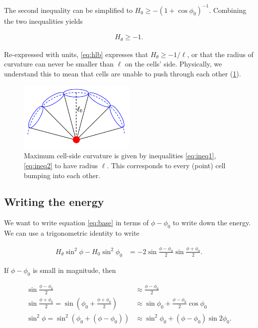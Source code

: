 \noindent The second inequality can be simplified to $H_0 \geq -(1+\cos\phi_0)^{-1}$. 
Combining the two inequalities yields 

\begin{align}
    H_\theta \geq -1. \label{eq:hlb}
\end{align}

\noindent Re-expressed with units, \cref{eq:hlb} expresses that $H_\theta \geq -1/\ell$, or that the radius of curvature can never be smaller than $\ell$ on the cells' side. 
Physically, we understand this to mean that cells are unable to push through each other (\cref{fig:maxcurv}).

\begin{figure}[hbtp]
    \centering
    \includegraphics[width=0.5\textwidth]{arc.png}
    \caption[Bounded sheet curvature permitted in the continuous sheet description]{Maximum cell-side curvature is given by inequalities \ref{eq:ineq1}, \ref{eq:ineq2} to have radius $\ell$. This corresponds to every (point) cell bumping into each other.}
    \label{fig:maxcurv}
\end{figure}

\subsection{Writing the energy}

We want to write equation \ref{eq:base} in terms of $\phi-\phi_0$ to write down the energy. We can use a trigonometric identity to write

\begin{align}
    H_\theta \sin^2\phi - H_0 \sin^2\phi_0 &= -2 \sin \frac{\phi - \phi_0}{2} \sin\frac{\phi + \phi_0}{2}. \label{eq:preapprox}
\end{align}

\noindent If $\phi - \phi_0$ is small in magnitude, then 

\begin{align*}
    \sin\frac{\phi - \phi_0}{2} &\approx \frac{\phi - \phi_0}{2} \\
    \sin\frac{\phi + \phi_0}{2} = \sin\left(\phi_0 + \frac{\phi + \phi_0}{2} \right) &\approx \sin\phi_0 + \frac{\phi - \phi_0}{2} \cos\phi_0 \\
    \sin^2\phi = \sin^2\left(\phi_0 + (\phi - \phi_0) \right) &\approx \sin^2\phi_0 +(\phi - \phi_0)\sin2\phi_0.
\end{align*}

